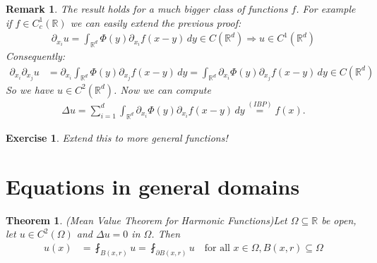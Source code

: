 \documentclass{report}
\theoremstyle{tommy}
\newtheorem{thm}[defn]{Theorem}
\newtheorem{rem}[defn]{Remark}
\newtheorem{ex}[defn]{Exercise}
\begin{document}
\begin{rem}
  The result holds for a much bigger class of functions \(f\). For example if \(f \in C_c^1(\mathbb{R})\) we can easily extend the previous proof:
  \begin{align*}
    \partial_{x_i} u = \int_{\mathbb{R}^d} \Phi(y) \partial_{x_i} f(x-y) \, dy \in C(\mathbb{R}^d) \Rightarrow u \in C^1(\mathbb{R}^d)
  \end{align*}
  Consequently: 
  \begin{align*}
    \partial_{x_i} \partial_{x_j} u 
    &= \partial_{x_i} \int_{\mathbb{R}^d} \Phi(y) \partial_{x_j} f(x-y) \, dy
    = \int_{\mathbb{R}^d} \partial_{x_i} \Phi(y) \partial_{x_j} f(x-y) \, dy \in C(\mathbb{R}^d)
  \end{align*}
  So we have \(u \in C^2(\mathbb{R}^d)\). Now we can compute
  \begin{align*}
    \Delta u = \sum_{i=1}^d \int_{\mathbb{R}^d} \partial_{x_i} \Phi(y) \partial_{x_i} f(x-y) \, dy \overset{(IBP)}{=} f(x).
  \end{align*}
\end{rem}

\begin{ex}
  Extend this to more general functions!
\end{ex}

\section{Equations in general domains}
\begin{thm} (Mean Value Theorem for Harmonic Functions)\label{mean-value-theorem} 
  Let \(\Omega \subseteq \mathbb{R}\) be open, let \( u \in C^2(\Omega)\) and \(\Delta u = 0\) in \(\Omega\). Then
  \begin{align*}
    u(x) 
    &= \fint_{B(x, r)} u
    = \fint_{\partial B(x, r)} u \quad \text{for all } x \in \Omega, B(x,r) \subseteq \Omega
  \end{align*}
\end{thm}
\end{document}

